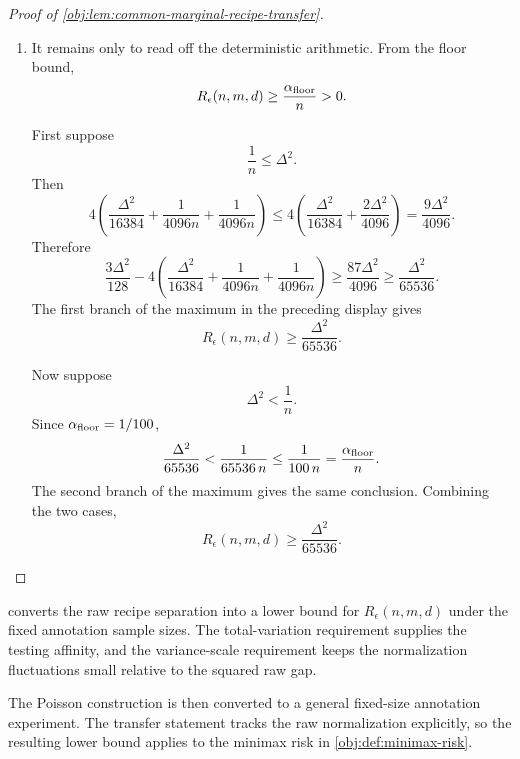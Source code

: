 \documentclass[11pt]{article}
\begin{document}
\begin{proof}[Proof of \cref{obj:lem:common-marginal-recipe-transfer}]
\begin{enumerate}
\item It remains only to read off the deterministic arithmetic.  From the floor bound,
\[
R_\epsilon(n,m,d)\ge \frac{\alpha_{\rm floor}}{n}>0.
\]

First suppose
\[
\frac1n\le \Delta^2.
\]
Then
\[
4\left(\frac{\Delta^2}{16384}
+\frac1{4096n}
+\frac1{4096n}\right)
\le
4\left(\frac{\Delta^2}{16384}
+\frac{2\Delta^2}{4096}\right)
=
\frac{9\Delta^2}{4096}.
\]
Therefore
\[
\frac{3\Delta^2}{128}
-
4\left(\frac{\Delta^2}{16384}
+\frac1{4096n}
+\frac1{4096n}\right)
\ge
\frac{87\Delta^2}{4096}
\ge
\frac{\Delta^2}{65536}.
\]
The first branch of the maximum in the preceding display gives
\[
R_\epsilon(n,m,d)\ge \frac{\Delta^2}{65536}.
\]

Now suppose
\[
\Delta^2<\frac1n.
\]
Since \(\alpha_{\rm floor}=1/100\),
\[
\frac{\Delta^2}{65536}
<
\frac1{65536\,n}
\le
\frac1{100\,n}
=
\frac{\alpha_{\rm floor}}{n}.
\]
The second branch of the maximum gives the same conclusion.  Combining the two cases,
\[
R_\epsilon(n,m,d)\ge \frac{\Delta^2}{65536}.
\] %
\end{enumerate}
\end{proof}

 converts the raw recipe separation into a lower bound for \(R_\epsilon(n,m,d)\) under the fixed annotation sample sizes. The total-variation requirement supplies the testing affinity, and the variance-scale requirement keeps the normalization fluctuations small relative to the squared raw gap.

The Poisson construction is then converted to a general fixed-size annotation experiment. The transfer statement tracks the raw normalization explicitly, so the resulting lower bound applies to the minimax risk in \cref{obj:def:minimax-risk}.
\end{document}
